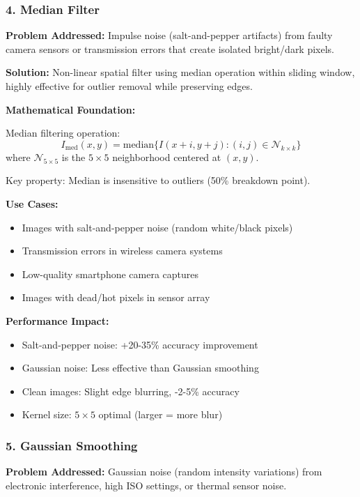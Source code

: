 \documentclass[12pt,a4paper]{article}
\begin{document}
\subsubsection*{4. Median Filter}

\textbf{Problem Addressed:} Impulse noise (salt-and-pepper artifacts) from faulty camera sensors or transmission errors that create isolated bright/dark pixels.

\textbf{Solution:} Non-linear spatial filter using median operation within sliding window, highly effective for outlier removal while preserving edges.

\textbf{Mathematical Foundation:}

Median filtering operation:
\begin{equation*}
    I_{\text{med}}(x, y) = \text{median}\{I(x+i, y+j) : (i,j) \in \mathcal{N}_{k \times k}\}
\end{equation*}
where $\mathcal{N}_{5 \times 5}$ is the $5 \times 5$ neighborhood centered at $(x, y)$.

Key property: Median is insensitive to outliers (50\% breakdown point).

\textbf{Use Cases:}
\begin{itemize}
    \item Images with salt-and-pepper noise (random white/black pixels)
    \item Transmission errors in wireless camera systems
    \item Low-quality smartphone camera captures
    \item Images with dead/hot pixels in sensor array
\end{itemize}

\textbf{Performance Impact:}
\begin{itemize}
    \item Salt-and-pepper noise: +20-35\% accuracy improvement
    \item Gaussian noise: Less effective than Gaussian smoothing
    \item Clean images: Slight edge blurring, -2-5\% accuracy
    \item Kernel size: $5 \times 5$ optimal (larger = more blur)
\end{itemize}

\subsubsection*{5. Gaussian Smoothing}

\textbf{Problem Addressed:} Gaussian noise (random intensity variations) from electronic interference, high ISO settings, or thermal sensor noise.
\end{document}
